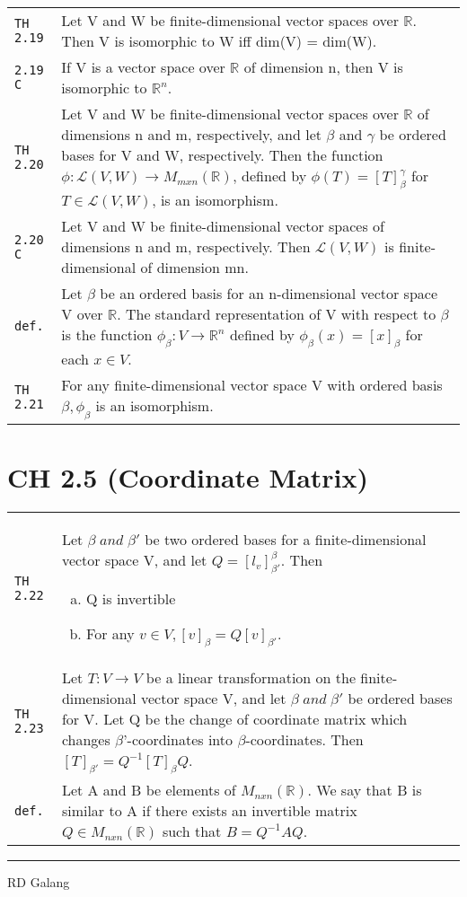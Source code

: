 \documentclass[10pt,landscape]{article}
\begin{document}
\begin{multicols}{3}
\begin{tabular}{@{}p{\the\MyLen}%
                @{}p{\linewidth-\the\MyLen}@{}}
\verb!TH 2.19! & Let V and W be finite-dimensional vector spaces over $\mathbb{R}$. Then V is isomorphic to W iff dim(V) = dim(W).\\
\verb!2.19 C! & If V is a vector space over $\mathbb{R}$ of dimension n, then V is isomorphic to $\mathbb{R}^n$.\\
\verb!TH 2.20! & Let V and W be finite-dimensional vector spaces over $\mathbb{R}$ of dimensions n and m, respectively, and let $\beta$ and $\gamma$ be ordered bases for V and W, respectively. 
			 Then the function $\phi :\mathscr{L}(V,W)\rightarrow M_{mxn}(\mathbb{R})$, defined by $\phi (T)=[T]_\beta^\gamma$ for $T\!\in\!\mathscr{L}(V,W)$, is an isomorphism.\\
\verb!2.20 C! & Let V and W be finite-dimensional vector spaces of dimensions n and m, respectively. Then $\mathscr{L}(V,W)$ is finite-dimensional of dimension mn.\\
\verb!def.! & Let $\beta$ be an ordered basis for an n-dimensional vector space V over $\mathbb{R}$. The standard representation of V with respect to $\beta$ is the function $\phi_\beta :V\rightarrow\mathbb{R}^n$ defined by $\phi_\beta (x) = [x]_\beta$ for each $x\!\in\! V$.\\
\verb!TH 2.21! & For any finite-dimensional vector space V with ordered basis $\beta , \phi_\beta$ is an isomorphism.
\end{tabular}



\section{CH 2.5 (Coordinate Matrix)}
\begin{tabular}{@{}p{\the\MyLen}%
                @{}p{\linewidth-\the\MyLen}@{}} %
\verb!TH 2.22! & Let $\beta\; and\;\beta '$ be two ordered bases for a finite-dimensional vector space V, and let $Q = [l_v]_{\beta '}^\beta $. Then
			\begin{enumerate}[a)]
			\item Q is invertible
			\item For any $v\!\in\! V, [v]_\beta = Q[v]_{\beta '}$.
			\end{enumerate}\\
\verb!TH 2.23! & Let $T:V\rightarrow V$ be a linear transformation on the finite-dimensional vector space V, and let $\beta\; and\;\beta '$ be ordered bases for V. Let Q be the change of coordinate matrix which changes $\beta$'-coordinates into $\beta$-coordinates.
			Then $[T]_{\beta '} = Q^{-1}[T]_\beta Q$.\\
\verb!def.! & Let A and B be elements of $M_{n x n}(\mathbb{R})$. We say that B is similar to A if there exists an invertible matrix $Q\!\in\!M_{n x n}(\mathbb{R})$ such that $B = Q^{-1}AQ$.
\end{tabular}




\rule{0.3\linewidth}{0.25pt}
\scriptsize

RD Galang

\end{multicols}
\end{document}
